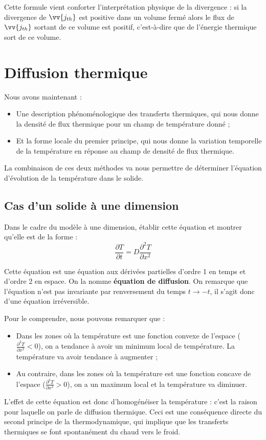 \documentclass[11pt,fleqn]{book} %
\begin{document}
\begin{remark}
	Cette formule vient conforter l'interprétation physique de la divergence : si la divergence de $\vv{j_{th}}$ est positive dans un volume fermé alors le flux de $\vv{j_{th}}$ sortant de ce volume est positif, c'est-à-dire que de l'énergie thermique sort de ce volume.
\end{remark}

\section{Diffusion thermique}

Nous avons maintenant :
\begin{itemize}
	\item Une description phénoménologique des transferts thermiques, qui nous donne la densité de flux thermique pour un champ de température donné ;
	\item Et la forme locale du premier principe, qui nous donne la variation temporelle de la température en réponse au champ de densité de flux thermique.
\end{itemize}

La combinaison de ces deux méthodes va nous permettre de déterminer l'équation d'évolution de la température dans le solide.

\subsection{Cas d'un solide à une dimension}

\begin{capex}
	Dans le cadre du modèle à une dimension, établir cette équation et montrer qu'elle est de la forme :
	\begin{equation}
		\frac{\partial T}{\partial t} = D \frac{\partial^2 T}{\partial x^2}
	\end{equation}
\end{capex}

Cette équation est une équation aux dérivées partielles d'ordre 1 en temps et d'ordre 2 en espace. On la nomme \textbf{équation de diffusion}. On remarque que l'équation n'est pas invariante par renversement du temps $t \to -t$, il s'agit donc d'une équation irréversible.

Pour le comprendre, nous pouvons remarquer que :
\begin{itemize}
	\item Dans les zones où la température est une fonction convexe de l'espace ($\frac{\partial^2 T}{\partial x^2} < 0$), on a tendance à avoir un minimum local de température. La température va avoir tendance à augmenter ;
	\item Au contraire, dans les zones où la température est une fonction concave de l'espace ($\frac{\partial^2 T}{\partial x^2} > 0$), on a un maximum local et la température va diminuer.
\end{itemize}
L'effet de cette équation est donc d'homogénéiser la température : c'est la raison pour laquelle on parle de diffusion thermique. Ceci est une conséquence directe du second principe de la thermodynamique, qui implique que les transferts thermiques se font spontanément du chaud vers le froid.
\end{document}
